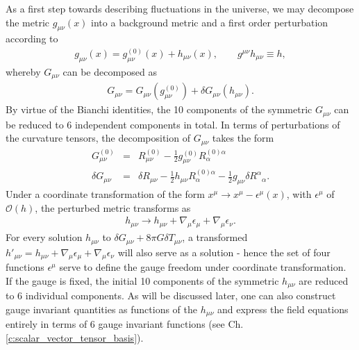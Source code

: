 As a first step towards describing fluctuations in the universe, we may decompose the metric $g_{\mu\nu}(x)$ into a background metric and a first order perturbation according to
\begin{eqnarray}
g_{\mu\nu}(x) = g_{\mu\nu}^{(0)}(x) + h_{\mu\nu}(x),\qquad g^{\mu\nu}h_{\mu\nu} \equiv h,
\end{eqnarray}
whereby $G_{\mu\nu}$ can be decomposed as
\begin{eqnarray}
G_{\mu\nu} = G_{\mu\nu}(g_{\mu\nu}^{(0)}) + \delta G_{\mu\nu}(h_{\mu\nu}).
\end{eqnarray}
By virtue of the Bianchi identities, the 10 components of the symmetric $G_{\mu\nu}$ can be reduced to 6 independent components in total. In terms of perturbations of the curvature tensors, the decomposition of $G_{\mu\nu}$ takes the form
\begin{eqnarray}
G_{\mu\nu}^{(0)} &=& R_{\mu\nu}^{(0)} -\frac{1}{2} g_{\mu\nu}^{(0)} R_\alpha^{(0)\alpha}
\label{Einzero}
\\
\delta G_{\mu\nu} &=& \delta R_{\mu\nu} - \frac{1}{2} h_{\mu\nu} R_\alpha^{(0)\alpha} -\frac{1}{2}g_{\mu\nu}\delta R^\alpha{}_\alpha.
\label{Einone}
\end{eqnarray}
Under a coordinate transformation of the form $x^\mu \to x^\mu - \epsilon^\mu(x)$, with $\epsilon^\mu$ of $\mathcal O(h)$, the perturbed metric transforms as
\begin{eqnarray}
h_{\mu\nu} \to h_{\mu\nu} + \nabla_\mu \epsilon_\mu + \nabla_\mu \epsilon_\nu. 
\label{gaugeh}
\end{eqnarray}
For every solution $h_{\mu\nu}$ to $\delta G_{\mu\nu}+8\pi G \delta T_{\mu\nu}$, a transformed $h'_{\mu\nu}=h_{\mu\nu} + \nabla_\mu \epsilon_\mu + \nabla_\mu \epsilon_\nu$ will also serve as a solution - hence the set of four functions $\epsilon^\mu$ serve to define the gauge freedom under coordinate transformation. If the gauge is fixed, the initial 10 components of the symmetric $h_{\mu\nu}$ are reduced to 6 individual components. As will be discussed later, one can also construct gauge invariant quantities as functions of the $h_{\mu\nu}$ and express the field equations entirely in terms of 6 gauge invariant functions (see Ch. \ref{c:scalar_vector_tensor_basis}).


